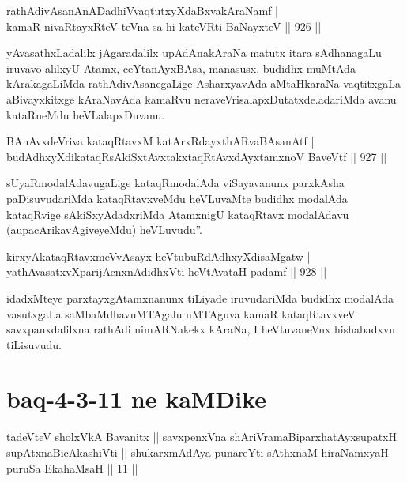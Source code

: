 \begin{shl}
rathAdivAsanAnADadhiVvaqtutxyXdaBxvakAraNamf | \\
kamaR nivaRtayxRteV teVna sa hi kateVRti BaNayxteV \hfill||  926 ||  
\end{shl}

\begin{artha}
yAvasathxLadalilx jAgaradalilx upAdAnakAraNa matutx itara sAdhanagaLu iruvavo alilxyU Atamx, ceYtanAyxBAsa, manasusx, budidhx muMtAda kArakagaLiMda rathAdivAsanegaLige AsharxyavAda aMtaHkaraNa vaqtitxgaLa aBivayxkitxge kAraNavAda kamaRvu neraveVrisalapxDutatxde.adariMda avanu kataRneMdu heVLalapxDuvanu.
\end{artha}


\begin{shl}
BAnAvxdeVriva kataqRtavxM katArxRdayxthARvaBAsanAtf | \\
budAdhxyXdikataqRsAkiSxtAvxtakxtaqRtAvxdAyxtamxnoV BaveVtf \hfill||  927 ||  
\end{shl}

\begin{artha}
sUyaRmodalAdavugaLige kataqRmodalAda viSayavanunx parxkAsha paDisuvudariMda kataqRtavxveMdu heVLuvaMte budidhx modalAda kataqRvige sAkiSxyAdadxriMda AtamxnigU kataqRtavx modalAdavu (aupacArikavAgiveyeMdu) heVLuvudu''.
\end{artha}


\begin{shl}
kirxyAkataqRtavxmeVvAsayx heVtubuRdAdhxyXdisaMgatw | \\
yathAvasatxvXparijAcnxnAdidhxVti heVtAvataH padamf \hfill||  928 ||  
\end{shl}

\begin{artha}
idadxMteye parxtayxgAtamxnanunx tiLiyade iruvudariMda budidhx modalAda vasutxgaLa saMbaMdhavuMTAgalu uMTAguva kamaR kataqRtavxveV savxpanxdalilxna rathAdi nimARNakekx  kAraNa, I heVtuvaneVnx hishabadxvu tiLisuvudu.
\end{artha}

\section*{baq-4-3-11 ne kaMDike}

\begin{shl}
tadeVteV sholxVkA Bavanitx || savxpenxVna shAriVramaBiparxhatAyxsupatxH supAtxnaBicAkashiVti || shukarxmAdAya punareYti sAthxnaM hiraNamxyaH puruSa EkahaMsaH || 11 ||
\end{shl}

